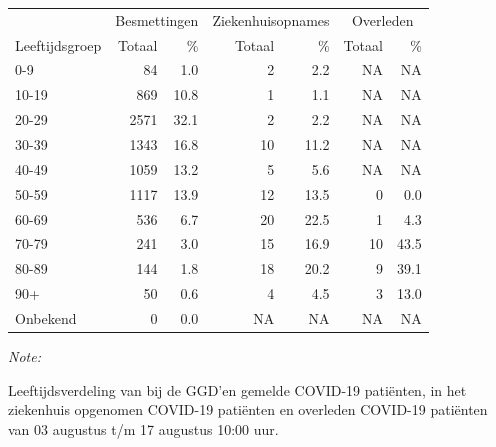 \documentclass[
  english,
  man,floatsintext]{apa6}
\begin{document}
\begin{table}[H]
\centering\begingroup\fontsize{11}{13}\selectfont

\begin{threeparttable}
\begin{tabular}{lrrrrrr}
\toprule
\multicolumn{1}{c}{ } & \multicolumn{2}{c}{Besmettingen} & \multicolumn{2}{c}{Ziekenhuisopnames} & \multicolumn{2}{c}{Overleden} \\
\cmidrule(l{3pt}r{3pt}){2-3} \cmidrule(l{3pt}r{3pt}){4-5} \cmidrule(l{3pt}r{3pt}){6-7}
Leeftijdsgroep & Totaal & \% & Totaal & \% & Totaal & \%\\
\midrule
0-9 & 84 & 1.0 & 2 & 2.2 & NA & NA\\
10-19 & 869 & 10.8 & 1 & 1.1 & NA & NA\\
20-29 & 2571 & 32.1 & 2 & 2.2 & NA & NA\\
30-39 & 1343 & 16.8 & 10 & 11.2 & NA & NA\\
40-49 & 1059 & 13.2 & 5 & 5.6 & NA & NA\\
50-59 & 1117 & 13.9 & 12 & 13.5 & 0 & 0.0\\
60-69 & 536 & 6.7 & 20 & 22.5 & 1 & 4.3\\
70-79 & 241 & 3.0 & 15 & 16.9 & 10 & 43.5\\
80-89 & 144 & 1.8 & 18 & 20.2 & 9 & 39.1\\
90+ & 50 & 0.6 & 4 & 4.5 & 3 & 13.0\\
Onbekend & 0 & 0.0 & NA & NA & NA & NA\\
\bottomrule
\end{tabular}
\begin{tablenotes}
\item \textit{Note: } 
\item Leeftijdsverdeling van bij de GGD’en gemelde COVID-19 patiënten, in het ziekenhuis opgenomen COVID-19 patiënten en overleden COVID-19 patiënten van 03 augustus t/m 17 augustus 10:00 uur.
\end{tablenotes}
\end{threeparttable}
\endgroup{}
\end{table}
\end{document}
